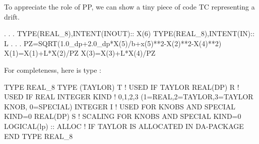 \documentclass{hitec}     %
\begin{document}
To appreciate the role of PP, we can show a tiny piece of code  TC representing a drift.
\begin{code}
                      .
                      .
                      .
    TYPE(REAL_8),INTENT(INOUT):: X(6)
    TYPE(REAL_8),INTENT(IN):: L
                      .
                      .
                      .
          PZ=SQRT(1.0_dp+2.0_dp*X(5)/b+x(5)**2-X(2)**2-X(4)**2)
          X(1)=X(1)+L*X(2)/PZ
          X(3)=X(3)+L*X(4)/PZ
\end{code}         
 
 For completeness, here is  type :
 
 \begin{code}
   TYPE REAL_8
     TYPE (TAYLOR) T      !  USED IF TAYLOR
     REAL(DP) R           !    USED IF REAL
     INTEGER KIND  !  0,1,2,3 (1=REAL,2=TAYLOR,3=TAYLOR KNOB, 0=SPECIAL)
     INTEGER I   !   USED FOR KNOBS AND SPECIAL KIND=0
     REAL(DP) S   !   SCALING FOR KNOBS AND SPECIAL KIND=0
     LOGICAL(lp) :: ALLOC  ! IF TAYLOR IS ALLOCATED IN DA-PACKAGE
  END TYPE REAL_8
 \end{code}
 
\end{document}
